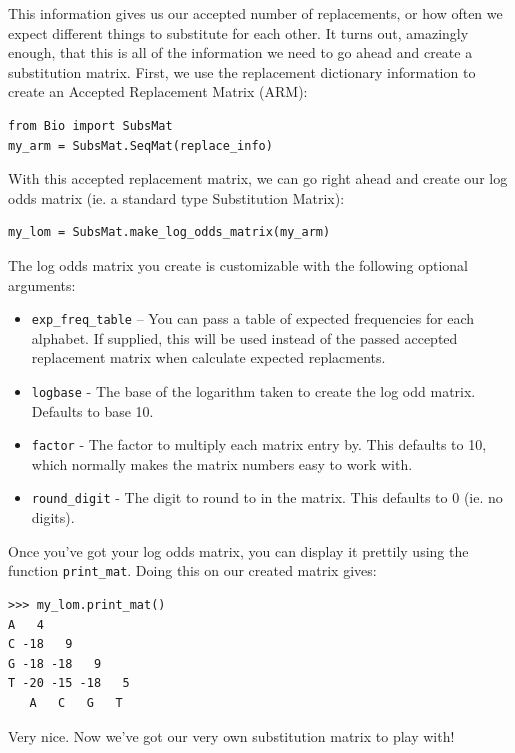 \documentclass{report}
\begin{document}
This information gives us our accepted number of replacements, or how often we expect different things to substitute for each other. It turns out, amazingly enough, that this is all of the information we need to go ahead and create a substitution matrix. First, we use the replacement dictionary information to create an Accepted Replacement Matrix (ARM):

\begin{verbatim}
from Bio import SubsMat
my_arm = SubsMat.SeqMat(replace_info)
\end{verbatim}

With this accepted replacement matrix, we can go right ahead and create our log odds matrix (ie. a standard type Substitution Matrix):

\begin{verbatim}
my_lom = SubsMat.make_log_odds_matrix(my_arm)
\end{verbatim}

The log odds matrix you create is customizable with the following optional arguments:

\begin{itemize}
  \item \verb|exp_freq_table| -- You can pass a table of expected frequencies for each alphabet. If supplied, this will be used instead of the passed accepted replacement matrix when calculate expected replacments.

  \item \verb|logbase| - The base of the logarithm taken to create the log odd matrix. Defaults to base 10.

  \item \verb|factor| - The factor to multiply each matrix entry by. This defaults to 10, which normally makes the matrix numbers easy to work with.

  \item \verb|round_digit| - The digit to round to in the matrix. This defaults to 0 (ie. no digits).
\end{itemize}

Once you've got your log odds matrix, you can display it prettily using the function \verb|print_mat|. Doing this on our created matrix gives:

\begin{verbatim}
>>> my_lom.print_mat()
A   4
C -18   9
G -18 -18   9
T -20 -15 -18   5
   A   C   G   T
\end{verbatim}

Very nice. Now we've got our very own substitution matrix to play with!
\end{document}
